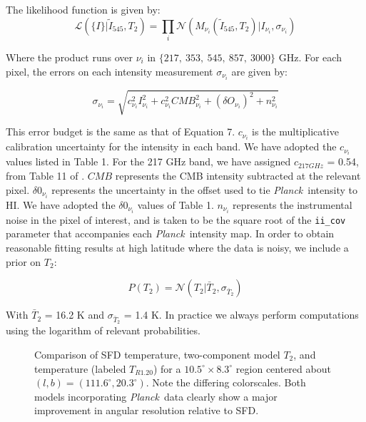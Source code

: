 \documentclass{emulateapj}
\newcommand{\PLANCK}{{\it Planck}}
\begin{document}
The likelihood function is given by:
\begin{equation}
\mathcal{L}(\{I\}|\tilde{I}_{545}, T_2) = \displaystyle\prod\limits_{i}\mathcal{N}(M_{\nu_{i}}(\tilde{I}_{545}, T_2)|I_{\nu_{i}}, \sigma_{\nu_i})
\end{equation}


Where the product runs over $\nu_i$ in $\{217,\ 353,\ 545,\ 857,\ 3000\}$ GHz. 
For each pixel, the errors on each intensity measurement $\sigma_{\nu_i}$ are 
given by:

\begin{equation}
\sigma_{\nu_i} = \sqrt{c^2_{\nu_i}I^2_{\nu_i} + c^2_{\nu_i}CMB^2_{\nu_i} + (\delta O_{\nu_i})^2 + n^2_{\nu_i}}
\end{equation}

This error budget is the same as that of \cite{planckdust} Equation 7. 
$c_{\nu_i}$ is the multiplicative calibration uncertainty for the intensity in 
each band. We have adopted the $c_{\nu_i}$ values listed in \cite{planckdust} 
Table 1. For the 217 GHz band, we have assigned $c_{217 GHz}$ = 0.54, from 
Table 11 of \cite{planckcalib}. $CMB$ represents the CMB intensity 
subtracted at the relevant pixel. $\delta0_{\nu_i}$ represents the uncertainty
in the offset used to tie \PLANCK~intensity to HI. We have adopted the 
 $\delta0_{\nu_i}$ values of \cite{planckdust} Table 1. $n_{\nu_i}$ represents 
the instrumental noise in the pixel of interest, and is taken to be the square 
root of the \verb|ii_cov| parameter that accompanies each \PLANCK~intensity 
map. In order to obtain reasonable fitting results at high latitude where the 
data is noisy, we include a prior on $T_2$:


\begin{equation}
P(T_2) = \mathcal{N}(T_2|\bar{T}_2, \sigma_{\bar{T}_2})
\end{equation}

With $\bar{T}_2$ = 16.2 K and $\sigma_{\bar{T}_2}$ = 1.4 K. In practice we 
always perform computations using the logarithm of relevant probabilities.

\begin{figure}
\begin{center}
\caption{\label{fig:comparison} Comparison of SFD temperature, two-component 
model $T_2$, and \cite{planckdust} temperature (labeled $T_{R1.20}$) for a
 $10.5^{\circ}\times8.3^{\circ}$  region centered about 
$(l,b) = (111.6^{\circ}, 20.3^{\circ})$. Note the 
differing colorscales. Both models incorporating \PLANCK~data clearly show a 
major improvement in angular resolution relative to SFD.}
\end{center}
\end{figure}
\end{document}
